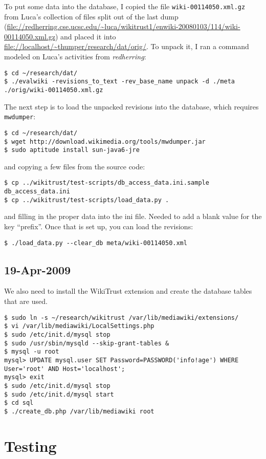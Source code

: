 To put some data into the database, I copied the
file \texttt{wiki-00114050.xml.gz} from Luca's collection
of files split out of the last dump
(\url{file://redherring.cse.ucsc.edu/~luca/wikitrust1/enwiki-20080103/114/wiki-00114050.xml.gz})
and placed it into \url{file://localhost/~thumper/research/dat/orig/}.
To unpack it, I ran a command modeled on Luca's activities from
\textit{redherring}:
\begin{verbatim}
$ cd ~/research/dat/
$ ./evalwiki -revisions_to_text -rev_base_name unpack -d ./meta ./orig/wiki-00114050.xml.gz
\end{verbatim}

The next step is to load the unpacked revisions into the database,
which requires \texttt{mwdumper}:
\begin{verbatim}
$ cd ~/research/dat/
$ wget http://download.wikimedia.org/tools/mwdumper.jar
$ sudo aptitude install sun-java6-jre
\end{verbatim}
and copying a few files from the source code:
\begin{verbatim}
$ cp ../wikitrust/test-scripts/db_access_data.ini.sample db_access_data.ini
$ cp ../wikitrust/test-scripts/load_data.py .
\end{verbatim}
and filling in the proper data into the ini file.
Needed to add a blank value for the key ``prefix''.
Once that is set up, you can load the revisions:
\begin{verbatim}
$ ./load_data.py --clear_db meta/wiki-00114050.xml
\end{verbatim}

\subsection{19-Apr-2009}

We also need to install the WikiTrust extension and
create the database tables that are used.
\begin{verbatim}
$ sudo ln -s ~/research/wikitrust /var/lib/mediawiki/extensions/
$ vi /var/lib/mediawiki/LocalSettings.php
$ sudo /etc/init.d/mysql stop
$ sudo /usr/sbin/mysqld --skip-grant-tables &
$ mysql -u root
mysql> UPDATE mysql.user SET Password=PASSWORD('info!age') WHERE User='root' AND Host='localhost';
mysql> exit
$ sudo /etc/init.d/mysql stop
$ sudo /etc/init.d/mysql start
$ cd sql
$ ./create_db.php /var/lib/mediawiki root
\end{verbatim}


\section{Testing}


